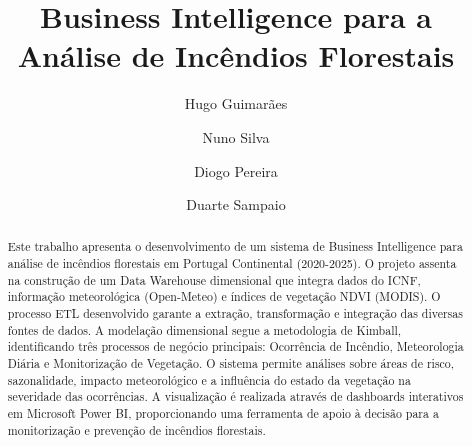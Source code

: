 \documentclass[runningheads]{llncs}
\begin{document}
%
\title{Business Intelligence para a Análise de Incêndios Florestais}
%
%

\author{Hugo Guimarães \and
Nuno Silva \and
Diogo Pereira \and
Duarte Sampaio}
%
%

%
\maketitle              %
%
\begin{abstract}
	Este trabalho apresenta o desenvolvimento de um sistema de Business Intelligence para análise de incêndios florestais em Portugal Continental (2020-2025). O projeto assenta na construção de um Data Warehouse dimensional que integra dados do ICNF, informação meteorológica (Open-Meteo) e índices de vegetação NDVI (MODIS). O processo ETL desenvolvido garante a extração, transformação e integração das diversas fontes de dados. A modelação dimensional segue a metodologia de Kimball, identificando três processos de negócio principais: Ocorrência de Incêndio, Meteorologia Diária e Monitorização de Vegetação. O sistema permite análises sobre áreas de risco, sazonalidade, impacto meteorológico e a influência do estado da vegetação na severidade das ocorrências. A visualização é realizada através de dashboards interativos em Microsoft Power BI, proporcionando uma ferramenta de apoio à decisão para a monitorização e prevenção de incêndios florestais.
	
\end{abstract}
%
%
%










%

\end{document}
